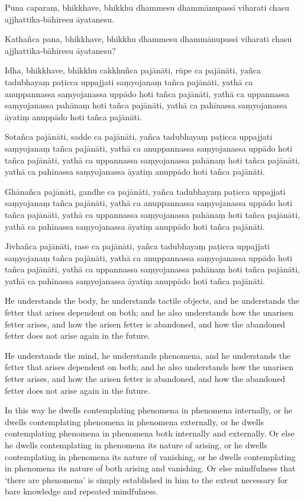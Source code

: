 Puna caparaṃ, bhikkhave, bhikkhu dhammesu dhammānupassī viharati chasu
ajjhattika-bāhiresu āyatanesu.

Kathañca pana, bhikkhave, bhikkhu dhammesu dhammānupassī viharati chasu
ajjhattika-bāhiresu āyatanesu?

Idha, bhikkhave, bhikkhu
cakkhuñca pajānāti,
rūpe ca pajānāti,
yañca tadubhayaṃ paṭicca uppajjati saṃyojanaṃ tañca pajānāti,
yathā ca anuppannassa saṃyojanassa uppādo hoti tañca pajānāti,
yathā ca uppannassa saṃyojanassa pahānaṃ hoti tañca pajānāti,
yathā ca pahīnassa saṃyojanassa āyatiṃ anuppādo hoti tañca pajānāti.

Sotañca pajānāti,
sadde ca pajānāti,
yañca tadubhayaṃ paṭicca uppajjati saṃyojanaṃ tañca pajānāti,
yathā ca anuppannassa saṃyojanassa uppādo hoti tañca pajānāti,
yathā ca uppannassa saṃyojanassa pahānaṃ hoti tañca pajānāti,
yathā ca pahīnassa saṃyojanassa āyatiṃ anuppādo hoti tañca pajānāti.

Ghānañca pajānāti,
gandhe ca pajānāti,
yañca tadubhayaṃ paṭicca uppajjati saṃyojanaṃ tañca pajānāti,
yathā ca anuppannassa saṃyojanassa uppādo hoti tañca pajānāti,
yathā ca uppannassa saṃyojanassa pahānaṃ hoti tañca pajānāti,
yathā ca pahīnassa saṃyojanassa āyatiṃ anuppādo hoti tañca pajānāti.

Jivhañca pajānāti,
rase ca pajānāti,
yañca tadubhayaṃ paṭicca uppajjati saṃyojanaṃ tañca pajānāti,
yathā ca anuppannassa saṃyojanassa uppādo hoti tañca pajānāti,
yathā ca uppannassa saṃyojanassa pahānaṃ hoti tañca pajānāti,
yathā ca pahīnassa saṃyojanassa āyatiṃ anuppādo hoti tañca pajānāti.

\englishPage

He understands the body, he understands tactile objects, and he understands the
fetter that arises dependent on both; and he also understands how the unarisen
fetter arises, and how the arisen fetter is abandoned, and how the abandoned
fetter does not arise again in the future.

He understands the mind, he understands phenomena, and he understands the fetter
that arises dependent on both; and he also understands how the unarisen fetter
arises, and how the arisen fetter is abandoned, and how the abandoned fetter
does not arise again in the future.

In this way he dwells contemplating phenomena in phenomena internally, or he
dwells contemplating phenomena in phenomena externally, or he dwells
contemplating phenomena in phenomena both internally and externally. Or else he
dwells contemplating in phenomena its nature of arising, or he dwells
contemplating in phenomena its nature of vanishing, or he dwells contemplating
in phenomena its nature of both arising and vanishing. Or else mindfulness that
‘there are phenomena’ is simply established in him to the extent necessary for
bare knowledge and repeated mindfulness.

